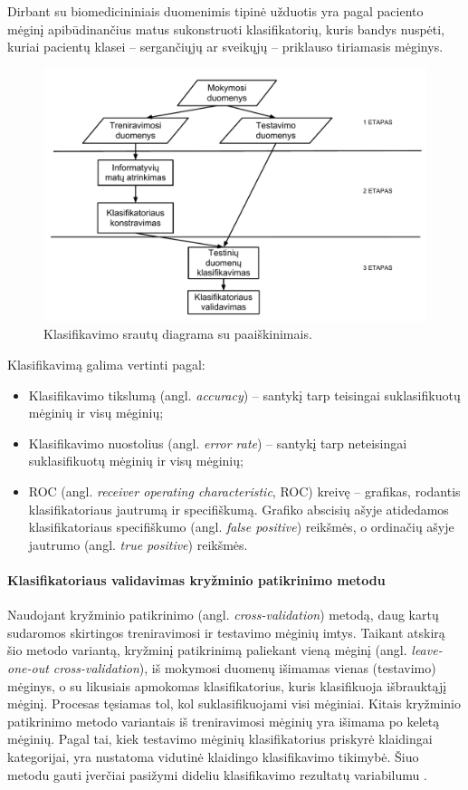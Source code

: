 Dirbant su biomedicininiais duomenimis tipinė užduotis yra pagal paciento mėginį apibūdinančius matus sukonstruoti klasifikatorių, kuris bandys nuspėti, kuriai pacientų klasei -- sergančiųjų ar sveikųjų -- priklauso tiriamasis mėginys.
\begin{figure}
 \centering
 \includegraphics[width=\textwidth]{images/classification_process.pdf}
 \caption{Klasifikavimo srautų diagrama su paaiškinimais.}
 \label{fig:classification_process}
\end{figure}
Klasifikavimą galima vertinti pagal:
\begin{itemize}
 \item Klasifikavimo tikslumą (angl. \textit{accuracy}) -- santykį tarp teisingai suklasifikuotų mėginių ir visų mėginių;
 \item Klasifikavimo nuostolius (angl. \textit{error rate}) -- santykį tarp neteisingai suklasifikuotų mėginių ir visų mėginių;
 \item ROC (angl. \textit{receiver operating characteristic}, ROC) kreivę -- grafikas, rodantis klasifikatoriaus jautrumą ir specifiškumą. Grafiko abscisių ašyje atidedamos klasifikatoriaus specifiškumo (angl. \textit{false positive}) reikšmės, o ordinačių ašyje jautrumo (angl. \textit{true positive}) reikšmės.
\end{itemize}

\paragraph{Klasifikatoriaus validavimas kryžminio patikrinimo metodu}

Naudojant kryžminio patikrinimo (angl. \textit{cross-validation}) metodą, daug kartų sudaromos skirtingos treniravimosi ir testavimo mėginių imtys. Taikant atskirą šio metodo variantą, kryžminį patikrinimą paliekant vieną mėginį (angl. \textit{leave-one-out cross-validation}), iš mokymosi duomenų išimamas vienas (testavimo) mėginys, o su likusiais apmokomas klasifikatorius, kuris klasifikuoja išbrauktąjį mėginį. Procesas tęsiamas tol, kol suklasifikuojami visi mėginiai. Kitais kryžminio patikrinimo metodo variantais iš treniravimosi mėginių yra išimama po keletą mėginių. Pagal tai, kiek testavimo mėginių klasifikatorius priskyrė klaidingai kategorijai, yra nustatoma vidutinė klaidingo klasifikavimo tikimybė. Šiuo metodu gauti įverčiai pasižymi dideliu klasifikavimo rezultatų variabilumu \cite{braga2004cross}.

